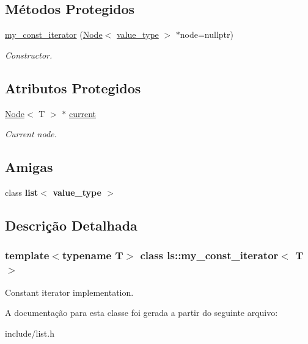 \subsection*{Métodos Protegidos}
\begin{DoxyCompactItemize}
\item 
\mbox{\label{classls_1_1my__const__iterator_a8ab448e804fac2d5117de8c8261a5873}} 
\hyperlink{classls_1_1my__const__iterator_a8ab448e804fac2d5117de8c8261a5873}{my\+\_\+const\+\_\+iterator} (\hyperlink{structls_1_1Node}{Node}$<$ \hyperlink{classls_1_1my__const__iterator_aa7aa8489a065e4ddda33727d33c84b7d}{value\+\_\+type} $>$ $\ast$node=nullptr)
\begin{DoxyCompactList}\small\item\em Constructor. \end{DoxyCompactList}\end{DoxyCompactItemize}
\subsection*{Atributos Protegidos}
\begin{DoxyCompactItemize}
\item 
\mbox{\label{classls_1_1my__const__iterator_a18548367e7f30dc4e358eff9172ba995}} 
\hyperlink{structls_1_1Node}{Node}$<$ T $>$ $\ast$ \hyperlink{classls_1_1my__const__iterator_a18548367e7f30dc4e358eff9172ba995}{current}
\begin{DoxyCompactList}\small\item\em Current node. \end{DoxyCompactList}\end{DoxyCompactItemize}
\subsection*{Amigas}
\begin{DoxyCompactItemize}
\item 
\mbox{\label{classls_1_1my__const__iterator_aa4cf6f043abfca0b41eb074c92dac6fa}} 
class {\bfseries list$<$ value\+\_\+type $>$}
\end{DoxyCompactItemize}


\subsection{Descrição Detalhada}
\subsubsection*{template$<$typename T$>$\newline
class ls\+::my\+\_\+const\+\_\+iterator$<$ T $>$}

Constant iterator implementation. 

A documentação para esta classe foi gerada a partir do seguinte arquivo\+:\begin{DoxyCompactItemize}
\item 
include/list.\+h\end{DoxyCompactItemize}
